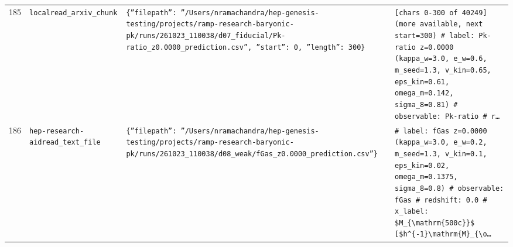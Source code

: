 \documentclass[11pt,a4paper]{article}
\begin{document}
\begin{longtable}{@{}p{}p{}p{}p{}@{}}
185 & \texttt{local}\newline\texttt{read\_\allowbreak{}arxiv\_\allowbreak{}chunk} & \texttt{\{''filepath'':\allowbreak{} ''/\allowbreak{}Users/\allowbreak{}nramachandra/\allowbreak{}hep-genesis-testing/\allowbreak{}projects/\allowbreak{}ramp-research-baryonic-pk/\allowbreak{}runs/\allowbreak{}261023\_\allowbreak{}110038/\allowbreak{}d07\_\allowbreak{}fiducial/\allowbreak{}Pk-ratio\_\allowbreak{}z0.0000\_\allowbreak{}prediction.csv'',\allowbreak{} ''start'':\allowbreak{} 0,\allowbreak{} ''length'':\allowbreak{} 300\}\allowbreak{}} & \texttt{[chars 0-300 of 40249]\allowbreak{} (more available,\allowbreak{} next start=\allowbreak{}300)\allowbreak{}  \# label:\allowbreak{} Pk-ratio z=\allowbreak{}0.0000 (kappa\_\allowbreak{}w=\allowbreak{}3.0,\allowbreak{} e\_\allowbreak{}w=\allowbreak{}0.6,\allowbreak{} m\_\allowbreak{}seed=\allowbreak{}1.3,\allowbreak{} v\_\allowbreak{}kin=\allowbreak{}0.65,\allowbreak{} eps\_\allowbreak{}kin=\allowbreak{}0.61,\allowbreak{} omega\_\allowbreak{}m=\allowbreak{}0.142,\allowbreak{} sigma\_\allowbreak{}8=\allowbreak{}0.81)\allowbreak{} \# observable:\allowbreak{} Pk-ratio \# r\ldots{}\allowbreak{}} \\
186 & \texttt{hep-research-aid}\newline\texttt{read\_\allowbreak{}text\_\allowbreak{}file} & \texttt{\{''filepath'':\allowbreak{} ''/\allowbreak{}Users/\allowbreak{}nramachandra/\allowbreak{}hep-genesis-testing/\allowbreak{}projects/\allowbreak{}ramp-research-baryonic-pk/\allowbreak{}runs/\allowbreak{}261023\_\allowbreak{}110038/\allowbreak{}d08\_\allowbreak{}weak/\allowbreak{}fGas\_\allowbreak{}z0.0000\_\allowbreak{}prediction.csv''\}\allowbreak{}} & \texttt{\# label:\allowbreak{} fGas z=\allowbreak{}0.0000 (kappa\_\allowbreak{}w=\allowbreak{}3.0,\allowbreak{} e\_\allowbreak{}w=\allowbreak{}0.2,\allowbreak{} m\_\allowbreak{}seed=\allowbreak{}1.3,\allowbreak{} v\_\allowbreak{}kin=\allowbreak{}0.1,\allowbreak{} eps\_\allowbreak{}kin=\allowbreak{}0.02,\allowbreak{} omega\_\allowbreak{}m=\allowbreak{}0.1375,\allowbreak{} sigma\_\allowbreak{}8=\allowbreak{}0.8)\allowbreak{} \# observable:\allowbreak{} fGas \# redshift:\allowbreak{} 0.0 \# x\_\allowbreak{}label:\allowbreak{} \$M\_\allowbreak{}\{\textbackslash{}\allowbreak{}mathrm\{500c\}\allowbreak{}\}\allowbreak{}\$ [\$h\textasciicircum{}\allowbreak{}\{-1\}\allowbreak{}\textbackslash{}\allowbreak{}mathrm\{M\}\allowbreak{}\_\allowbreak{}\{\textbackslash{}\allowbreak{}o\ldots{}\allowbreak{}} \\

\end{longtable}
\end{document}
